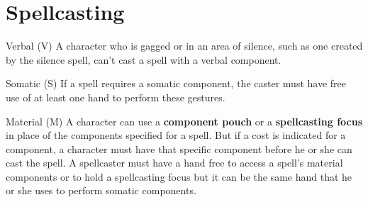 \documentclass[a4paper,10pt,twoside,twocolumn]{dndbook} %
\begin{document}
	\section{Spellcasting} 
	\begin{DndSidebar}{Verbal (V)}
		A character who is gagged or in an area of silence, such as one created by the silence spell, can't cast a spell with a verbal component.
	\end{DndSidebar}
	\begin{DndSidebar}{Somatic (S)}
		If a spell requires a somatic component, the caster must have free use of at least one hand to perform these gestures.
	\end{DndSidebar}
	\begin{DndSidebar}{Material (M)}
		A character can use a \textbf{component pouch} or a \textbf{spellcasting focus} in place of the components specified for a spell. But if a cost is indicated for a component, a character must have that specific component before he or she can cast the spell.
		A spellcaster must have a hand free to access a spell's material components or to hold a spellcasting focus but it can be the same hand that he or she uses to perform somatic components. 
	\end{DndSidebar}

\end{document}
